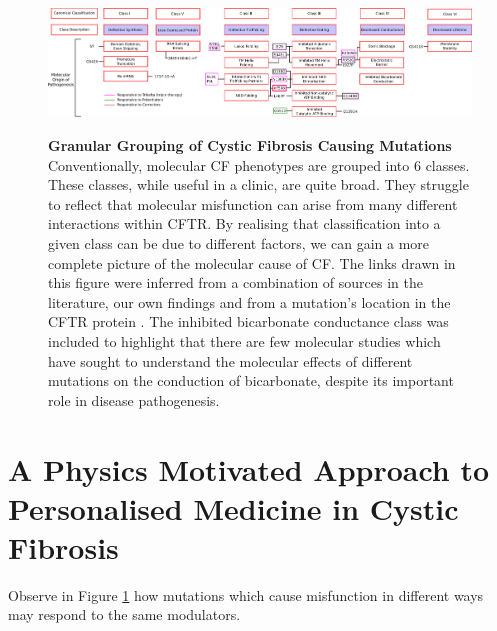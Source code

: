 \begin{landscape}
\begin{figure}
	\begin{center}
	\includegraphics[width=1.5\textwidth]{figures/perspective/classes_mutations.pdf}\\
	\end{center}
	\captionsetup{singlelinecheck = false, justification=raggedright}
	\caption[Granular grouping of CF pathogenesis]{\textbf{Granular Grouping of Cystic Fibrosis Causing Mutations}{ Conventionally, molecular CF phenotypes are grouped into 6 classes. These classes, while useful in a clinic, are quite broad. They struggle to reflect that molecular misfunction can arise from many different interactions within CFTR. By realising that classification into a given class can be due to different factors, we can gain a more complete picture of the molecular cause of CF. The links drawn in this figure were inferred from a combination of sources in the literature, our own findings and from a mutation's location in the CFTR protein \cite{bompadre2007, yeh2019a, gong2004, wong2022, vangoor2009, vangoor2014, hoffmann2018, thelin2007, gene2008, trikafta_website, phuan2018, ensinck2022}. The inhibited bicarbonate conductance class was included to highlight that there are few molecular studies which have sought to understand the molecular effects of different mutations on the conduction of bicarbonate, despite its important role in disease pathogenesis. }
	}

	\label{granular_classification}
\end{figure}
\end{landscape}

\section{A Physics Motivated Approach to Personalised Medicine in Cystic Fibrosis}
Observe in Figure \ref{granular_classification} how mutations which cause misfunction in different ways may respond to the same modulators. 

